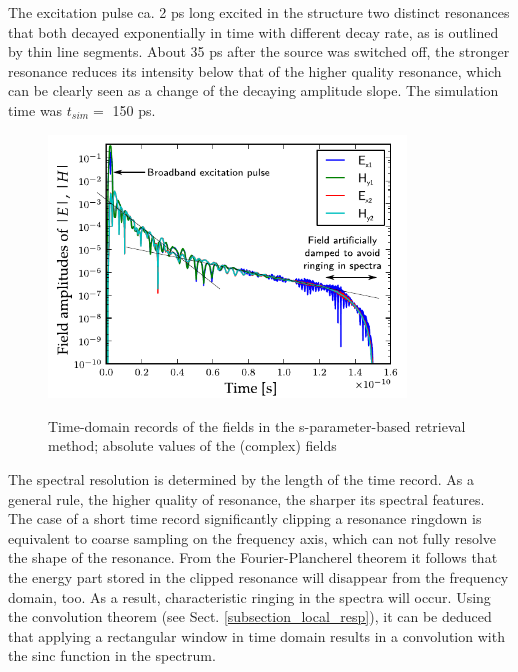 The excitation pulse ca. 2 ps long excited in the structure two distinct resonances that both decayed exponentially in time with different decay rate, as is outlined by thin line segments. About 35 ps after the source was switched off, the stronger resonance reduces its intensity below that of the higher quality resonance, which can be clearly seen as a change of the decaying amplitude slope. The simulation time  was $t_{sim} =$ 150 ps.
\begin{figure}[ht] \centering \caption{Time-domain records of the fields in the s-parameter-based retrieval method; absolute values of the (complex) fields} \includegraphics[width=9.5cm]{img/sim_timedomain_debug.pdf} \label{fg_sparam_timedomain} \end{figure}


The spectral resolution is determined by the length of the time record. As a general rule, the higher quality of resonance, the sharper its spectral features. The case of a short time record significantly clipping a resonance ringdown is equivalent to coarse sampling on the frequency axis, which can not fully resolve the shape of the resonance. From the Fourier-Plancherel theorem %
it follows that the energy part stored in the clipped resonance will disappear from the frequency domain, too. As a result, characteristic ringing in the spectra will occur. Using the convolution theorem (see Sect. \ref{subsection_local_resp}), it can be deduced that applying a rectangular window in time domain results in a convolution with the sinc function in the spectrum. 

